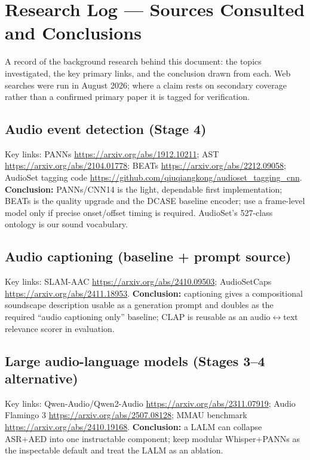 \documentclass[11pt,a4paper]{article}
\begin{document}
\appendix
\section{Research Log --- Sources Consulted and Conclusions}\label{sec:researchlog}
A record of the background research behind this document: the topics investigated, the key primary
links, and the conclusion drawn from each. Web searches were run in August 2026; where a claim rests
on secondary coverage rather than a confirmed primary paper it is tagged for verification.

\footnotesize
\subsection*{Audio event detection (Stage 4)}
Key links: PANNs \url{https://arxiv.org/abs/1912.10211}; AST \url{https://arxiv.org/abs/2104.01778};
BEATs \url{https://arxiv.org/abs/2212.09058}; AudioSet tagging code
\url{https://github.com/qiuqiangkong/audioset_tagging_cnn}.
\textbf{Conclusion:} PANNs/CNN14 is the light, dependable first implementation; BEATs is the quality
upgrade and the DCASE baseline encoder; use a frame-level model only if precise onset/offset timing
is required. AudioSet's 527-class ontology is our sound vocabulary.

\subsection*{Audio captioning (baseline + prompt source)}
Key links: SLAM-AAC \url{https://arxiv.org/abs/2410.09503}; AudioSetCaps
\url{https://arxiv.org/abs/2411.18953}.
\textbf{Conclusion:} captioning gives a compositional soundscape description usable as a generation
prompt and doubles as the required ``audio captioning only'' baseline; CLAP is reusable as an
audio$\leftrightarrow$text relevance scorer in evaluation.

\subsection*{Large audio-language models (Stages 3--4 alternative)}
Key links: Qwen-Audio/Qwen2-Audio \url{https://arxiv.org/abs/2311.07919}; Audio Flamingo 3
\url{https://arxiv.org/abs/2507.08128}; MMAU benchmark \url{https://arxiv.org/abs/2410.19168}.
\textbf{Conclusion:} a LALM can collapse ASR+AED into one instructable component; keep modular
Whisper+PANNs as the inspectable default and treat the LALM as an ablation.
\end{document}
